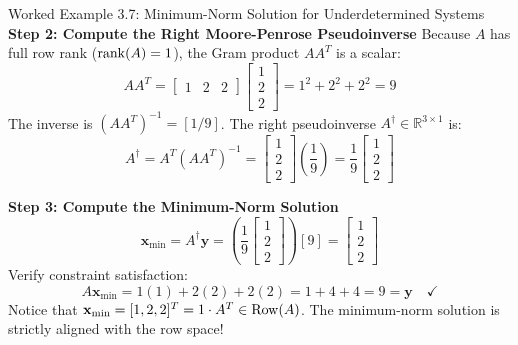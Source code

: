 \begin{examplebox}{Worked Example 3.7: Minimum-Norm Solution for Underdetermined Systems}
\textbf{Step 2: Compute the Right Moore-Penrose Pseudoinverse}
Because $A$ has full row rank ($\operatorname{rank}(A) = 1$), the Gram product $A A^T$ is a scalar:
\begin{equation*}
A A^T = \begin{bmatrix} 1 & 2 & 2 \end{bmatrix} \begin{bmatrix} 1 \\ 2 \\ 2 \end{bmatrix} = 1^2 + 2^2 + 2^2 = 9
\end{equation*}
The inverse is $(A A^T)^{-1} = [1/9]$.
The right pseudoinverse $A^\dagger \in \mathbb{R}^{3 \times 1}$ is:
\begin{equation*}
A^\dagger = A^T (A A^T)^{-1} = \begin{bmatrix} 1 \\ 2 \\ 2 \end{bmatrix} \left( \frac{1}{9} \right) = \frac{1}{9} \begin{bmatrix} 1 \\ 2 \\ 2 \end{bmatrix}
\end{equation*}

\textbf{Step 3: Compute the Minimum-Norm Solution}
\begin{equation*}
\mathbf{x}_{\mathrm{min}} = A^\dagger \mathbf{y} = \left( \frac{1}{9} \begin{bmatrix} 1 \\ 2 \\ 2 \end{bmatrix} \right) [9] = \begin{bmatrix} 1 \\ 2 \\ 2 \end{bmatrix}
\end{equation*}
Verify constraint satisfaction:
\begin{equation*}
A\mathbf{x}_{\mathrm{min}} = 1(1) + 2(2) + 2(2) = 1 + 4 + 4 = 9 = \mathbf{y} \quad \checkmark
\end{equation*}
Notice that $\mathbf{x}_{\mathrm{min}} = [1, 2, 2]^T = 1 \cdot A^T \in \operatorname{Row}(A)$. The minimum-norm solution is strictly aligned with the row space!


\end{examplebox}
